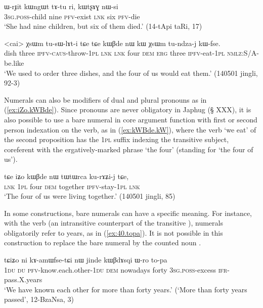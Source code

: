 \begin{exe}
\ex \label{ex:WrJit.kWngWt} 
\gll
ɯ-rɟit kɯngɯt tɤ-tu ri, kɯtʂɤɣ nɯ-si \\
\textsc{3sg.poss}-child nine \textsc{pfv}-exist \textsc{lnk} six \textsc{pfv}-die \\
\glt `She had nine children, but six of them died.' (14-tApi taRi, 17)
\end{exe}

\begin{exe}
\ex \label{ex:kWBde.kW} 
\gll <cai> χsɯm tu-sɯ-lɤt-i tɕe tɕe  kɯβde nɯ kɯ χsɯm tu-ndza-j kɯ-fse. \\
dish three \textsc{ipfv}-\textsc{caus}-throw-\textsc{1pl} \textsc{lnk} \textsc{lnk} four \textsc{dem} \textsc{erg} three \textsc{ipfv}-eat-\textsc{1pl} \textsc{nmlz}:S/A-be.like \\
\glt `We used to order three dishes, and the four of us would eat them.' (140501 jingli, 92-3)
\end{exe}		

Numerals can also be modifiers of dual and plural pronouns as in (\ref{ex:iZo.kWBde}). Since pronouns are never obligatory in Japhug (§ XXX), it is also possible to use a bare numeral in core argument function with first or second person indexation on the verb, as in (\ref{ex:kWBde.kW}), where the verb  `we eat' of the second proposition has the \textsc{1pl}  suffix indexing the transitive subject, coreferent with the ergatively-marked phrase  `the four' (standing for  `the four of us').

\begin{exe}
\ex \label{ex:iZo.kWBde} 
\gll tɕe iʑo kɯβde nɯ tɯtɯrca ku-rɤʑi-j tɕe, \\
\textsc{lnk} \textsc{1pl} four \textsc{dem}  together \textsc{ipfv}-stay-\textsc{1pl} \textsc{lnk} \\
\glt `The four of us were living together.' (140501 jingli, 85)
\end{exe}		

In some constructions, bare numerals can have a specific meaning. For instance, with the verb  (an intransitive counterpart of the transitive ), numerals obligatorily refer to years, as in (\ref{ex:40.topa}). It is not possible in this construction to replace the bare numeral by the counted noun  .

\begin{exe}
\ex \label{ex:40.topa} 
\gll tɕiʑo ni kɤ-amɯfse-tɕi nɯ jinde kɯβdɤsqi ɯ-ro to-pa \\
\textsc{1du} \textsc{du} \textsc{pfv}-know.each.other-\textsc{1du} \textsc{dem} nowadays forty \textsc{3sg.poss}-excess \textsc{ifr}-pass.X.years \\
\glt  `We have known each other for more than forty years.' (`More than forty years passed', 12-BzaNsa, 3)
 \end{exe}		
  
